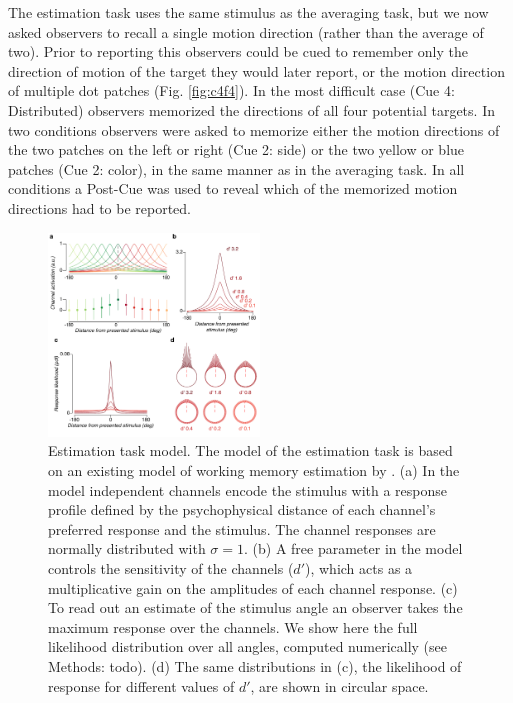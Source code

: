 The estimation task uses the same stimulus as the averaging task, but we now asked observers to recall a single motion direction (rather than the average of two). Prior to reporting this observers could be cued to remember only the direction of motion of the target they would later report, or the motion direction of multiple dot patches (Fig. \ref{fig:c4f4}). In the most difficult case (Cue 4: Distributed) observers memorized the directions of all four potential targets. In two conditions observers were asked to memorize either the motion directions of the two patches on the left or right (Cue 2: side) or the two yellow or blue patches (Cue 2: color), in the same manner as in the averaging task. In all conditions a Post-Cue was used to reveal which of the memorized motion directions had to be reported.

\begin{figure}
\centering
\includegraphics[keepaspectratio,width=0.5\textwidth]{figs_c4/f3_TCC_model.pdf}
\caption[Estimation task model]{Estimation task model. The model of the estimation task is based on an existing model of working memory estimation by \citet{Schurgin2018-vi}. (a) In the model independent channels encode the stimulus with a response profile defined by the psychophysical distance of each channel's preferred response and the stimulus. The channel responses are normally distributed with $\sigma=1$. (b) A free parameter in the model controls the sensitivity of the channels ($d'$), which acts as a multiplicative gain on the amplitudes of each channel response. (c) To read out an estimate of the stimulus angle an observer takes the maximum response over the channels. We show here the full likelihood distribution over all angles, computed numerically (see Methods: todo). (d) The same distributions in (c), the likelihood of response for different values of $d'$, are shown in circular space.}
\label{fig:c4f5}
\end{figure}

